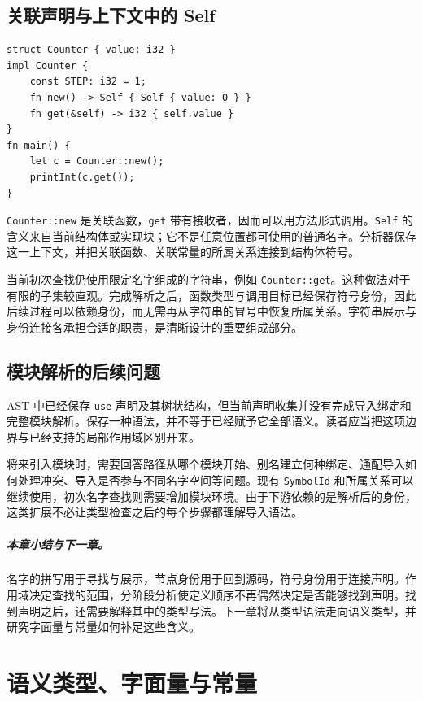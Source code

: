 \section{关联声明与上下文中的 Self}
\begin{lstlisting}[language=Rustless]
struct Counter { value: i32 }
impl Counter {
    const STEP: i32 = 1;
    fn new() -> Self { Self { value: 0 } }
    fn get(&self) -> i32 { self.value }
}
fn main() {
    let c = Counter::new();
    printInt(c.get());
}
\end{lstlisting}
\lstinline[language=Rustless]|Counter::new| 是关联函数，\lstinline[language=Rustless]|get| 带有接收者，因而可以用方法形式调用。\lstinline[language=Rustless]|Self| 的含义来自当前结构体或实现块；它不是任意位置都可使用的普通名字。分析器保存这一上下文，并把关联函数、关联常量的所属关系连接到结构体符号。

当前初次查找仍使用限定名字组成的字符串，例如 \texttt{Counter::get}。这种做法对于有限的子集较直观。完成解析之后，函数类型与调用目标已经保存符号身份，因此后续过程可以依赖身份，而无需再从字符串的冒号中恢复所属关系。字符串展示与身份连接各承担合适的职责，是清晰设计的重要组成部分。

\section{模块解析的后续问题}
AST 中已经保存 \lstinline[language=Rustless]|use| 声明及其树状结构，但当前声明收集并没有完成导入绑定和完整模块解析。保存一种语法，并不等于已经赋予它全部语义。读者应当把这项边界与已经支持的局部作用域区别开来。

将来引入模块时，需要回答路径从哪个模块开始、别名建立何种绑定、通配导入如何处理冲突、导入是否参与不同名字空间等问题。现有 \texttt{SymbolId} 和所属关系可以继续使用，初次名字查找则需要增加模块环境。由于下游依赖的是解析后的身份，这类扩展不必让类型检查之后的每个步骤都理解导入语法。

\paragraph{本章小结与下一章。}
名字的拼写用于寻找与展示，节点身份用于回到源码，符号身份用于连接声明。作用域决定查找的范围，分阶段分析使定义顺序不再偶然决定是否能够找到声明。找到声明之后，还需要解释其中的类型写法。下一章将从类型语法走向语义类型，并研究字面量与常量如何补足这些含义。

\chapter{语义类型、字面量与常量}
\label{chap:semantic-types}
